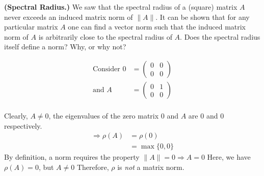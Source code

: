 \textbf{(Spectral Radius.)} We saw that the spectral radius of a
(square) matrix $A$ never exceeds an induced matrix norm of $\|A\|$.
It can be shown that for any particular matrix $A$ one can find a
vector norm such that the induced matrix norm of $A$ is arbitrarily
close to the spectral radius of $A$. Does the spectral radius itself
define a norm? Why, or why not?



{\color{blue}
\begin{align*}
\text{Consider } 0 &=\begin{pmatrix}
0 & 0\\
0 & 0
\end{pmatrix} \\
\text{and } A &=
\begin{pmatrix}
0 & 1\\
0 & 0
\end{pmatrix}\\
\end{align*}

Clearly, $A \neq 0$, the eigenvalues of the zero matrix $0$ and $A$ are $0$ and $0$
respectively.
\begin{align*}
\Rightarrow \rho(A) &= \rho(0) \\
&= \max \{0,0\}
\end{align*}
By definition, a norm requires the property $\|A\| = 0 \Rightarrow A = 0$
Here, we have $\rho(A)=0$, but $A \neq 0$
Therefore, $\rho$ is \textit{not} a matrix norm.

}
